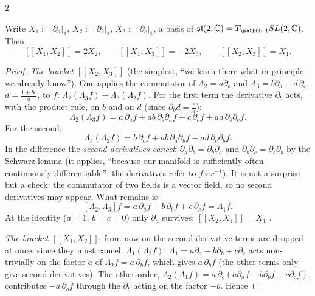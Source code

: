 \begin{paracol}{2}
\begin{theorem}\label{thm:sa-bracket}
Write $X_1:=\partial_a|_{\mathbb 1}$, $X_2:=\partial_b|_{\mathbb 1}$, $X_3:=\partial_c|_{\mathbb 1}$, a basis of $\mathfrak{sl}(2,\C)=T_{\mathbb 1}SL(2,\C)$. Then
\[
  [\![X_1,X_2]\!]=2X_2,\qquad[\![X_1,X_3]\!]=-2X_3,\qquad[\![X_2,X_3]\!]=X_1 .
\]
\end{theorem}
\begin{proof}
\emph{The bracket $[\![X_2,X_3]\!]$} (the simplest, ``we learn there what in principle we already know''). One applies the commutator of $\Lambda_2=a\partial_b$ and $\Lambda_3=b\partial_a+d\,\partial_c$, $d=\frac{1+bc}{a}$, to $f$: $\Lambda_2(\Lambda_3f)-\Lambda_3(\Lambda_2f)$. For the first term the derivative $\partial_b$ acts, with the product rule, on $b$ and on $d$ (since $\partial_bd=\frac ca$):
\[
  \Lambda_2(\Lambda_3f)=a\,\partial_af+ab\,\partial_b\partial_af+c\,\partial_cf+ad\,\partial_b\partial_cf .
\]
For the second,
\[
  \Lambda_3(\Lambda_2f)=b\,\partial_bf+ab\,\partial_a\partial_bf+ad\,\partial_c\partial_bf .
\]
In the difference the \emph{second derivatives cancel}: $\partial_a\partial_b=\partial_b\partial_a$ and $\partial_b\partial_c=\partial_c\partial_b$ by the Schwarz lemma (it applies, ``because our manifold is sufficiently often continuously differentiable'': the derivatives refer to $f\circ x^{-1}$). It is not a surprise but a check: the commutator of two fields is a vector field, so no second derivatives may appear. What remains is
\[
  [\Lambda_2,\Lambda_3]f=a\,\partial_af-b\,\partial_bf+c\,\partial_cf=\Lambda_1f .
\]
At the identity ($a=1$, $b=c=0$) only $\partial_a$ survives: $[\![X_2,X_3]\!]=X_1$                      .\par
\emph{The bracket $[\![X_1,X_2]\!]$}: from now on the second-derivative terms are dropped at once, since they must cancel. $\Lambda_1(\Lambda_2f)$: $\Lambda_1=a\partial_a-b\partial_b+c\partial_c$ acts non-trivially on the factor $a$ of $\Lambda_2f=a\,\partial_bf$, which gives $a\,\partial_bf$ (the other terms only give second derivatives). The other order, $\Lambda_2(\Lambda_1f)=a\,\partial_b(a\partial_af-b\partial_bf+c\partial_cf)$, contributes $-a\,\partial_bf$ through the $\partial_b$ acting on the factor $-b$. Hence

\end{proof}
\end{paracol}
